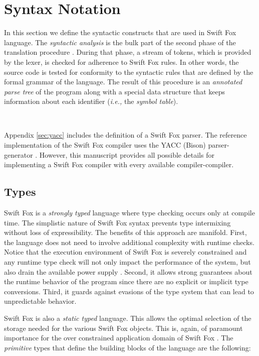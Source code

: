 \section{Syntax Notation}
\label{sec:syntax_notation}

In this section we define the syntactic constructs that are used in Swift
Fox language. The \textit{syntactic analysis} is the bulk part of the
second phase of the translation procedure \cite{aho:2007}. During that
phase, a stream of tokens, which is provided by the lexer, is checked for
adherence to Swift Fox rules. In other words, the source code is tested for
conformity to the syntactic rules that are defined by the formal grammar of
the language. The result of this procedure is an \textit{annotated parse 
tree} of the program along with a special data structure that keeps
information about each identifier (\textit{i.e.,} the \textit{symbol
table}).

\

\hangindent=4cm
\small
\noindent
Appendix \ref{sec:yacc} includes the definition of a Swift Fox parser. The
reference implementation of the Swift Fox compiler uses the YACC (Bison)
parser-generator \cite{johnson:1975,bison:2010}. However, this manuscript
provides all possible details for implementing a Swift Fox compiler with
every available compiler-compiler.
\normalsize

\subsection{Types}
\label{sec:types}

Swift Fox is a \textit{strongly typed} language \cite{cardelli:1991} where
type checking occurs only at compile time. The simplistic nature of Swift
Fox syntax prevents type intermixing without loss of expressibility. The
benefits of this approach are manifold. First, the language does not need
to involve additional complexity with runtime checks. Notice that the
execution environment of Swift Fox is severely constrained and any runtime 
type check will not only impact the performance of the system, but also
drain the available power supply \cite{marcin:whitepaper}. Second, it
allows strong guarantees about the runtime behavior of the program since
there are no explicit or implicit type conversions. Third, it guards
against evasions of the type system that can lead to unpredictable
behavior.

Swift Fox is also a \textit{static typed} language. This allows the optimal
selection of the storage needed for the various Swift Fox objects. This is,
again, of paramount importance for the over constrained application domain
of Swift Fox \cite{marcin:whitepaper}. The \textit{primitive} types that
define the building blocks of the language are the following:

